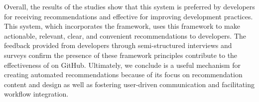 Overall, the results of the \suggs studies show that this system is preferred by developers for receiving recommendations and effective for improving development practices. This system, which incorporates the \framework framework, uses this framework to make actionable, relevant, clear, and convenient recommendations to developers. The feedback provided from developers through semi-structured interviews and surveys confirm the presence of these framework principles contribute to the effectiveness of \sugg on GitHub. Ultimately, we conclude \framework is a useful mechanism for creating automated recommendations because of its focus on recommendation content and design as well as fostering user-driven communication and facilitating workflow integration.








